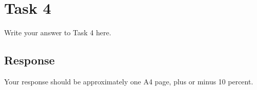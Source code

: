 
\section{Task 4}

Write your answer to Task 4 here.

\subsection{Response}

Your response should be approximately one A4 page, plus or minus 10 percent.